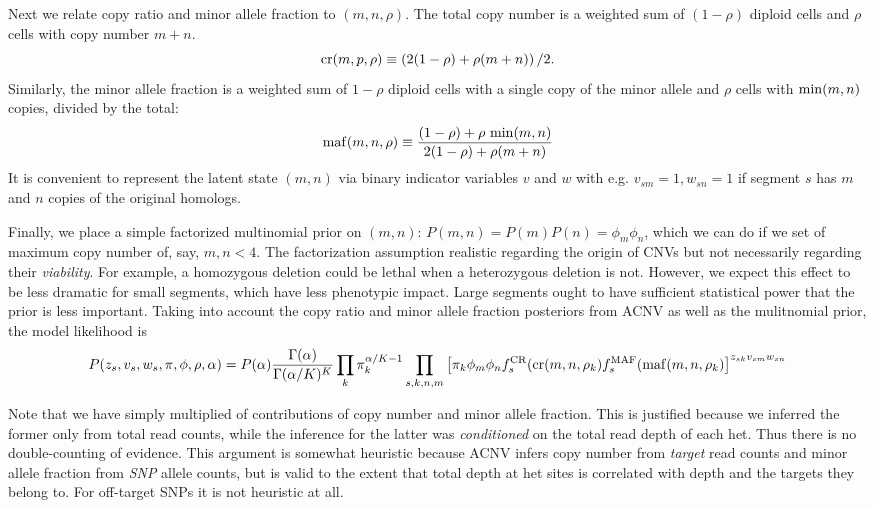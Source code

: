 \documentclass[nofootinbib,amssymb,amsmath]{revtex4}
\begin{document}
Next we relate copy ratio and minor allele fraction to $(m, n, \rho)$.  The total copy number is a weighted sum of $(1-\rho)$ diploid cells and $\rho$ cells with copy number $m+n$.  
%
\begin{equation}
{\rm cr}(m, p, \rho) \equiv \left( 2(1-\rho) + \rho(m + n) \right)/2.
\end{equation}
%
Similarly, the minor allele fraction is a weighted sum of $1 - \rho$ diploid cells with a single copy of the minor allele and $\rho$ cells with ${\rm min}(m,n)$ copies, divided by the total:
%
\begin{equation}
{\rm maf}(m, n, \rho) \equiv \frac{(1- \rho) + \rho ~ {\rm min}(m,n)}{2(1-\rho) + \rho (m + n)}
\end{equation}
%
It is convenient to represent the latent state $(m,n)$ via binary indicator variables $v$ and $w$ with e.g. $v_{sm} = 1, w_{sn} = 1$ if segment $s$ has $m$ and $n$ copies of the original homologs.

Finally, we place a simple factorized multinomial prior on $(m,n)$: $P(m,n) = P(m)P(n) = \phi_m \phi_n$, which we can do if we set of maximum copy number of, say, $m, n < 4$.  The factorization assumption realistic regarding the origin of CNVs but not necessarily regarding their \textit{viability}.  For example, a homozygous deletion could be lethal when a heterozygous deletion is not.  However, we expect this effect to be less dramatic for small segments, which have less phenotypic impact.  Large segments ought to have sufficient statistical power that the prior is less important.  Taking into account the copy ratio and minor allele fraction posteriors from ACNV as well as the mulitnomial prior, the model likelihood is
%
\begin{equation}
P(z_s, v_s, w_s, \pi, \phi, \rho, \alpha) = P(\alpha) \frac{ \Gamma(\alpha) }{\Gamma(\alpha/K)^K} \prod_k \pi_k^{\alpha/K - 1} \prod_{s, k,n,m} \left[ \pi_k \phi_m \phi_n f_s^{\rm CR}({\rm cr}(m,n,\rho_k) f_s^{\rm MAF}({\rm maf}(m,n,\rho_k) \right]^{z_{sk} v_{sm} w_{sn}}
\end{equation}
%

Note that we have simply multiplied of contributions of copy number and minor allele fraction.  This is justified because we inferred the former only from total read counts, while the inference for the latter was \textit{conditioned} on the total read depth of each het.  Thus there is no double-counting of evidence.  This argument is somewhat heuristic because ACNV infers copy number from \textit{target} read counts and minor allele fraction from \textit{SNP} allele counts, but is valid to the extent that total depth at het sites is correlated with depth and the targets they belong to.  For off-target SNPs it is not heuristic at all.
\end{document}
